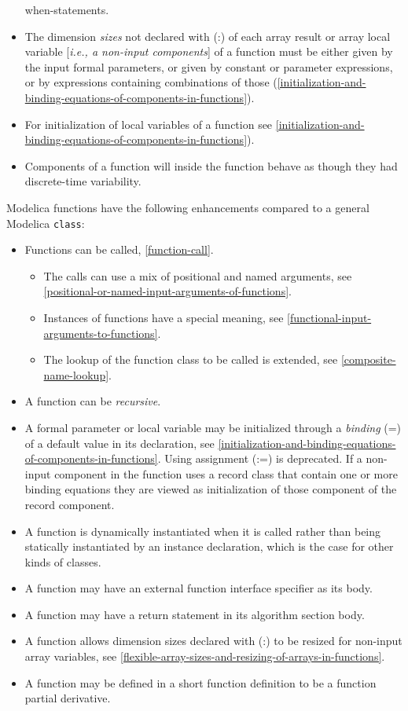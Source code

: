\begin{itemize}
  when-statements.
\item
  The dimension \emph{sizes} not declared with (:) of each array result
  or array local variable {[}\emph{i.e., a non-input components}{]} of a
  function must be either given by the input formal parameters, or given
  by constant or parameter expressions, or by expressions containing
  combinations of those (\autoref{initialization-and-binding-equations-of-components-in-functions}).
\item
  For initialization of local variables of a function see \autoref{initialization-and-binding-equations-of-components-in-functions}).
\item
  Components of a function will inside the function behave as though
  they had discrete-time variability.
\end{itemize}

Modelica functions have the following enhancements compared to a general
Modelica \lstinline!class!:

\begin{itemize}
\item
  Functions can be called, \autoref{function-call}.

  \begin{itemize}
  \item
    The calls can use a mix of positional and named arguments, see
    \autoref{positional-or-named-input-arguments-of-functions}.
  \item
    Instances of functions have a special meaning, see \autoref{functional-input-arguments-to-functions}.
  \item
    The lookup of the function class to be called is extended, see
    \autoref{composite-name-lookup}.
  \end{itemize}
\item
  A function can be \emph{recursive}.
\item
  A formal parameter or local variable may be initialized through a
  \emph{binding} (=) of a default value in its declaration,
  see \autoref{initialization-and-binding-equations-of-components-in-functions}.
  Using assignment (:=) is deprecated. If a non-input component in the
  function uses a record class that contain one or more binding
  equations they are viewed as initialization of those component of the
  record component.
\item
  A function is dynamically instantiated when it is called rather than
  being statically instantiated by an instance declaration, which is the
  case for other kinds of classes.
\item
  A function may have an external function interface specifier as its
  body.
\item
  A function may have a return statement in its algorithm section body.
\item
  A function allows dimension sizes declared with (:) to be resized for
  non-input array variables, see \autoref{flexible-array-sizes-and-resizing-of-arrays-in-functions}.
\item
  A function may be defined in a short function definition to be a
  function partial derivative.
\end{itemize}

